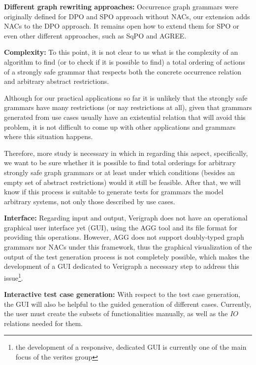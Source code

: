 
\textbf{Different graph rewriting approaches:} Occurrence graph grammars were originally defined for DPO and SPO approach without NACs, our extension adds NACs to the DPO approach. It remains open how to extend them for SPO or even other different approaches, such as SqPO and AGREE.

\textbf{Complexity:} To this point, it is not clear to us what is the complexity of an algorithm to find (or to check if it is possible to find) a total ordering of actions of a strongly safe grammar that respects both the concrete occurrence relation and arbitrary abstract restrictions.

  Although for our practical applications so far it is unlikely that the strongly safe grammars have many restrictions (or nay restrictions at all), given that grammars generated from use cases usually have an existential relation that will avoid this problem, it is not difficult to come up with other applications and grammars where this situation happens.

  Therefore, more study is necessary in which in regarding this aspect, specifically, we want to be sure whether it is possible to find total orderings for arbitrary strongly safe graph grammars or at least under which conditions (besides an empty set of abstract restrictions) would it still be feasible. After that, we will know if this process is suitable to generate tests for grammars the model arbitrary systems, not only those described by use cases.


\textbf{Interface:} Regarding input and output, Verigraph does not have an operational graphical user interface yet (GUI), using the AGG tool and its  file format for providing this operations. However, AGG does not support doubly-typed graph grammars nor NACs under this framework, thus the graphical visualization of the output of the test generation process is not completely possible, which makes the development of a GUI dedicated to Verigraph a necessary step to address this issue\footnote{the development
  of a responsive, dedicated GUI is currently one of the main focus of the verites group}.

\textbf{Interactive test case generation:} With respect to the test case generation, the GUI will also be helpful to the guided generation of different cases. Currently, the user must create the subsets of functionalities manually, as well as the $IO$ relations needed for them.

